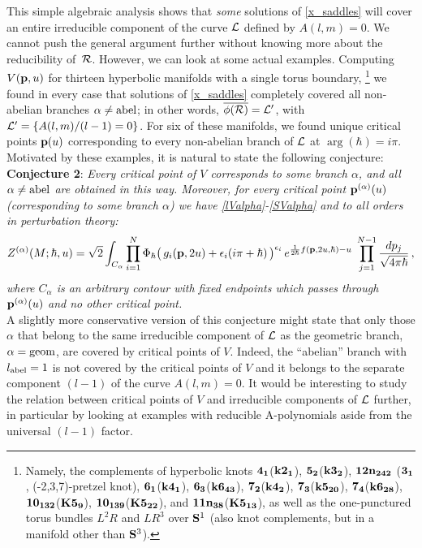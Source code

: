 \documentclass[hyper]{JHEP3}
\def\CL {{\cal L}}
\newcommand\be{\begin{equation}}
\newcommand\ee{\end{equation}}
\begin{document}
This simple algebraic analysis shows that {\it some} solutions of \eqref{x_saddles}
will cover an entire irreducible component of the curve $\CL$ defined by $A(l,m)=0$.
We cannot push the general argument further without knowing more about the reducibility of~$\cal R$.
However, we can look at some actual examples.
Computing $V ({\bf p},u)$ for thirteen hyperbolic manifolds with a single torus boundary,%
%
\footnote{Namely, the complements of hyperbolic knots
${\bf 4_1}$(${\bf k2_{1}}$), ${\bf 5_2}$(${\bf k3_{2}}$),
${\bf 12n_{242}}$ (${\bf 3_{1}}$, (-2,3,7)-pretzel knot),
${\bf 6_1}$(${\bf k4_{1}}$), ${\bf 6_3}$(${\bf k6_{43}}$),
${\bf 7_2}$(${\bf k4_{2}}$), ${\bf 7_3}$(${\bf k5_{20}}$),
${\bf 7_4}$(${\bf k6_{28}}$), ${\bf 10_{132}}$(${\bf K5_{9}}$),
${\bf 10_{139}}$(${\bf K5_{22}}$), and ${\bf 11n_{38}}$(${\bf K5_{13}}$),
as well as the one-punctured torus bundles $L^2R$ and $LR^3$ over ${\bf S}^1$
(also knot complements, but in a manifold other than ${\bf S}^3$).} %
%
we found in every case that solutions
of \eqref{x_saddles} { completely} covered all non-abelian branches $\alpha \neq {\rm abel}$; in other words,
$\overline{\phi(\cal R)} = \CL'$, with $\CL' = \{ A(l,m) / (l-1)=0 \}$.
For six of these manifolds, we found unique critical points
${\bf p} (u)$ corresponding to every non-abelian branch of $\CL$ at $\arg(\hbar)=i\pi$. Motivated by these examples, it is natural to state the following conjecture:\\

\noindent \textbf{Conjecture 2}: {\it
Every critical point of $V$ corresponds to some branch $\alpha$,
and all $\alpha \neq {\rm abel}$ are obtained in this way.
Moreover, for every critical point ${\bf p}^{(\alpha)}(u)$
(corresponding to some branch $\alpha$) we have
\eqref{lValpha}-\eqref{SValpha} and to all orders in perturbation theory:
\be
Z^{(\alpha)} (M; \hbar, u)
= \sqrt{2} \int_{C_{\alpha}}
\prod_{i=1}^{N} \Phi_{\hbar} \big( \, g_i ({\bf p}, 2u) +\epsilon_i (i \pi + \hbar) \,\big)^{\epsilon_i}\,
e^{\frac{1}{2\hbar} f({\bf p}, 2u, \hbar) - u} \; \prod_{j=1}^{N-1} \frac{dp_j}{\sqrt{4\pi\hbar}}\,,
\label{statesumdef}
\ee
where $C_{\alpha}$ is an arbitrary contour with fixed endpoints
which passes through ${\bf p}^{(\alpha)}(u)$ and no other critical point.}\\


A slightly more conservative version of this conjecture might state
that only those $\alpha$ that belong to the same irreducible component of $\CL$
as the geometric branch, $\alpha = {\rm geom}$, are covered by critical points of $V$.
Indeed, the ``abelian'' branch with $l_{{\rm abel}} = 1$ is not covered
by the critical points of $V$ and it belongs
to the separate component $(l-1)$ of the curve $A(l,m)=0$.
It would be interesting to study the relation between critical points of $V$
and irreducible components of $\CL$ further, in particular by looking at
examples with {reducible} A-polynomials aside from the universal $(l-1)$ factor.
\end{document}
